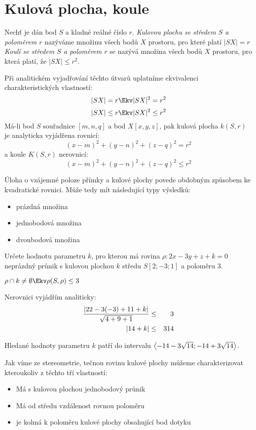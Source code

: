
\BeginDoc{}
\section{Kulová plocha, koule}

\Def
Nechť je dán bod $S$ a kladné reálné číslo $r$.
\emph{Kulovou plochu se středem $S$ a poloměrem $r$} nazýváme množinu všech bodů $X$ prostoru, pro které platí $|SX| = r$
\emph{Koulí se středem $S$ a poloměrem $r$} se nazývá množina všech bodů $X$ prostoru, pro která platí, že $|SX| \le r^2$.

\Poz Při analitickém vyjadřování těchto útvarů uplatníme ekvivalenci charakteristických vlastností:
$$ |SX| = r \Ekv  |SX|^2 = r^2 $$
$$ |SX|\le r \Ekv  |SX|^2\le r^2 $$
\V Má-li bod $S$ souřadnice $[m,n,q]$ a bod $X[x,y,z]$, pak kulová plocha $k(S,r)$
je analyticka vyjádřena rovnicí:
$$ (x-m)^2 + (y-n)^2 + (z-q)^2 = r^2 $$
a koule $K(S,r)$ nerovnicí:
$$ (x-m)^2 + (y-n)^2 + (z-q)^2 \le r^2 $$

\Poz
Úloha o vzájemné poloze přímky a kulové plochy povede obdobným způsobem ke kvadratické rovnici. Může tedy mít následující typy výsledků:
\begin{itemize}
	\item prázdná množina
	\item jednobodová množina
	\item dvoubodová množina
\end{itemize}

\Pr
Určete hodnotu parametru $k$, pro kterou má rovina $\rho : 2x-3y+z+k = 0$ neprázdný průnik s kulovou plochou $k$ středu $S[2;-3;1]$ a poloměru 3.

$\rho \cap k \neq \emptyset \Ekv \rho(S,\rho) \le 3$

Nerovnici vyjádřím analiticky:
\begin{eqnarray*}
	\f{|2\*2-3(-3)+1\*1+k|}{\sqrt{4+9+1}} &\le& 3\\
	|14+k| &\le& 3\* 14 
\end{eqnarray*}

Hledané hodnoty parametru $k$ patří do intervalu $\left< - 14 - 3 \sqrt{14};-14+3\sqrt{14} \right>$.

\Poz
Jak víme ze stereometrie, tečnou rovinu kulové plochy můžeme charakterizovat kteroukoliv z těchto tří vlastností:
\begin{itemize}
	\item Má s kulovou plochou jednobodový průnik
	\item Má od středu vzdálenost rovnou poloměru
	\item je kolmá k poloměru kulové plochy obsahující bod dotyku
\end{itemize}

